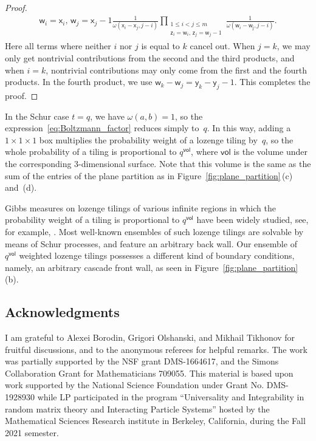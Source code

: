 \documentclass[pdftex]{sigma}
\numberwithin{equation}{section}
\begin{document}
\begin{proof}
\begin{gather*}
{{		\mathsf{w}_{i}=\mathsf{x}_{i}
		,\,
		\mathsf{w}_{j}=\mathsf{x}_{j}-1}}
		\frac{1}{\omega(\mathsf{x}_i-\mathsf{x}_j,j-i)}
		\prod_{\substack{1\le i<j\le m
		\\
		\mathsf{z}_{i}=\mathsf{w}_{i}
		,\,
		\mathsf{z}_{j}=\mathsf{w}_{j}-1}}
		\frac{1}{\omega(\mathsf{w}_i-\mathsf{w_j},j-i)}.
	\end{gather*}
	Here all terms where neither $i$ nor $j$ is equal to $k$
	cancel out. When $j=k$, we may only get nontrivial
	contributions from the second and the third products,
	and when $i=k$, nontrivial contributions may only come
	from the first and the fourth products. In the
	fourth product, we use
	$\mathsf{w}_k-\mathsf{w}_j=\mathsf{y}_k-\mathsf{y}_j-1$.
	This completes the proof.
\end{proof}

In the Schur case $t=q$,
we have $\omega(a,b)=1$,
so the expression~\eqref{eq:Boltzmann_factor}
reduces simply to~$q$.
In this way, adding a $1\times 1\times 1$
box multiplies the probability weight of a
lozenge tiling by~$q$, so the
whole probability of a tiling is
proportional to $q^{\mathsf{vol}}$,
where $\mathsf{vol}$ is the volume under the
corresponding 3-dimensional surface. Note that
this volume is
the same as
the sum of the entries of the plane partition
as in Figure~\ref{fig:plane_partition}\,(c) and~(d).

Gibbs measures
on lozenge tilings of various infinite regions
in which the probability weight of a tiling is
proportional to $q^{\mathsf{vol}}$
have been widely studied, see, for example,
\cite{BMRT2009BackWall,okounkov2003correlation,Okounkov2005}.
Most well-known ensembles of such lozenge tilings
are solvable by means of Schur processes, and feature
an arbitrary back wall. Our ensemble of~$q^{\mathsf{vol}}$ weighted
lozenge tilings possesses a different kind of boundary conditions,
namely, an arbitrary cascade front wall, as
seen in Figure~\ref{fig:plane_partition}\,(b).

\subsection*{Acknowledgments}

I am grateful to Alexei Borodin,
Grigori Olshanski, and Mikhail Tikhonov for fruitful discussions,
and to the anonymous referees for
helpful remarks.
The work was partially supported by the NSF
grant DMS-1664617, and the
Simons Collaboration Grant for Mathematicians 709055.
This material is based upon work supported by the National
Science Foundation under Grant No. DMS-1928930 while LP
participated in the program
``Universality and Integrability in random matrix theory and Interacting Particle Systems''
hosted by the Mathematical
Sciences Research institute in Berkeley, California, during
the Fall 2021 semester.
\end{document}

